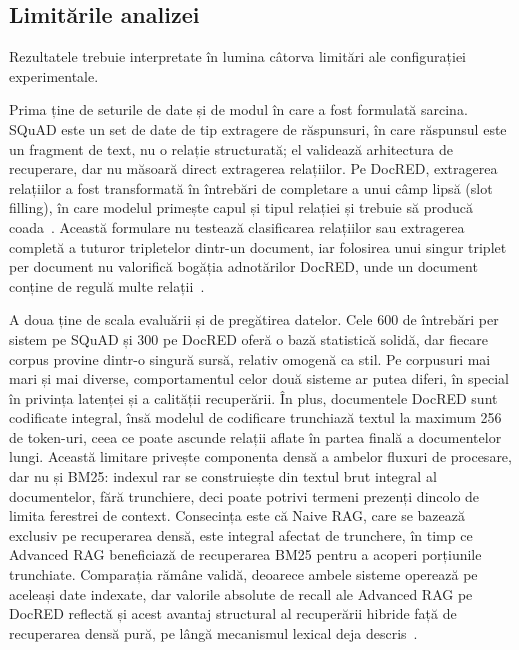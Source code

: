 \subsection{Limitările analizei}

Rezultatele trebuie interpretate în lumina câtorva limitări ale configurației experimentale.

Prima ține de seturile de date și de modul în care a fost formulată sarcina. SQuAD este un set de date de tip extragere de răspunsuri, în care răspunsul este un fragment de text, nu o relație structurată; el validează arhitectura de recuperare, dar nu măsoară direct extragerea relațiilor. Pe DocRED, extragerea relațiilor a fost transformată în întrebări de completare a unui câmp lipsă (slot filling), în care modelul primește capul și tipul relației și trebuie să producă coada~\cite{levy2017zeroshot}. Această formulare nu testează clasificarea relațiilor sau extragerea completă a tuturor tripletelor dintr-un document, iar folosirea unui singur triplet per document nu valorifică bogăția adnotărilor DocRED, unde un document conține de regulă multe relații~\cite{yao2019docred}.

A doua ține de scala evaluării și de pregătirea datelor. Cele 600 de întrebări per sistem pe SQuAD și 300 pe DocRED oferă o bază statistică solidă, dar fiecare corpus provine dintr-o singură sursă, relativ omogenă ca stil. Pe corpusuri mai mari și mai diverse, comportamentul celor două sisteme ar putea diferi, în special în privința latenței și a calității recuperării. În plus, documentele DocRED sunt codificate integral, însă modelul de codificare trunchiază textul la maximum 256 de token-uri, ceea ce poate ascunde relații aflate în partea finală a documentelor lungi. Această limitare privește componenta densă a ambelor fluxuri de procesare, dar nu și BM25: indexul rar se construiește din textul brut integral al documentelor, fără trunchiere, deci poate potrivi termeni prezenți dincolo de limita ferestrei de context. Consecința este că Naive RAG, care se bazează exclusiv pe recuperarea densă, este integral afectat de trunchere, în timp ce Advanced RAG beneficiază de recuperarea BM25 pentru a acoperi porțiunile trunchiate. Comparația rămâne validă, deoarece ambele sisteme operează pe aceleași date indexate, dar valorile absolute de recall ale Advanced RAG pe DocRED reflectă și acest avantaj structural al recuperării hibride față de recuperarea densă pură, pe lângă mecanismul lexical deja descris~\cite{yao2019docred}.

